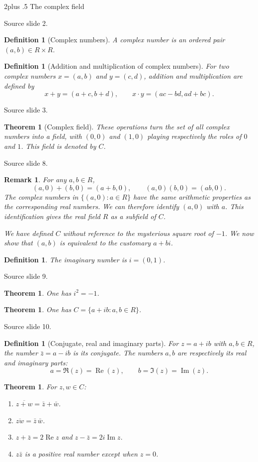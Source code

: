 \documentclass[10pt,letterpaper,twoside,openright]{amsbook}
\makeatletter
\numberwithin{equation}{subsection}
\renewcommand{\section}{\@startsection{section}{1}
 {\z@}{2\baselineskip plus .5\baselineskip}
 {\baselineskip}{\normalfont\Large\bfseries\centering}}
\theoremstyle{sea-plain}
\newtheorem{theorem}[subsection]{Theorem}
\theoremstyle{sea-definition}
\newtheorem{definition}[subsection]{Definition}
\newtheorem{remark}[subsection]{Remark}
\theoremstyle{sea-exercise}
\DeclareMathOperator{\Real}{Re}
\DeclareMathOperator{\Imag}{Im}
\newcommand{\RR}{\mathbb{R}}
\newcommand{\CC}{\mathbb{C}}
\newcommand{\DD}{\mathbb{D}}
\newcommand{\HH}{\mathbb{H}}
\newcommand{\Chat}{\mathbb{C}_{\infty}}
\def\CC{C}\def\RR{R}\def\DD{D}\def\HH{H}\def\Chat{C infinity}}
\newcommand{\src}[1]{\par\smallskip\noindent
 {\scriptsize\sffamily\color{SoftWhite}Source slide #1.}\par\nopagebreak\smallskip}
\makeatother
\begin{document}
\section{The complex field}
\src{2}
\begin{definition}[Complex numbers]
A complex number is an ordered pair $(a,b)\in\RR\times\RR$.
\end{definition}
\begin{definition}[Addition and multiplication of complex numbers]
For two complex numbers $x=(a,b)$ and $y=(c,d)$, addition and multiplication
are defined by
\[
 x+y=(a+c,b+d),\qquad x\cdot y=(ac-bd,ad+bc).
\]
\end{definition}
\src{3}
\begin{theorem}[Complex field]
These operations turn the set of all complex numbers into a field, with
$(0,0)$ and $(1,0)$ playing respectively the roles of $0$ and $1$.
This field is denoted by $\CC$.
\end{theorem}
\src{8}
\begin{remark}
For any $a,b\in\RR$,
\[
 (a,0)+(b,0)=(a+b,0),\qquad (a,0)(b,0)=(ab,0).
\]
The complex numbers in $\{(a,0):a\in\RR\}$ have the same arithmetic
properties as the corresponding real numbers. We can therefore identify
$(a,0)$ with $a$. This identification gives the real field $\RR$ as a
subfield of $\CC$.

We have defined $\CC$ without reference to the mysterious square root of
$-1$. We now show that $(a,b)$ is equivalent to the customary $a+bi$.
\end{remark}
\begin{definition}
The imaginary number is $i=(0,1)$.
\end{definition}
\src{9}
\begin{theorem}
One has $i^2=-1$.
\end{theorem}
\begin{theorem}
One has $\CC=\{a+ib:a,b\in\RR\}$.
\end{theorem}
\src{10}
\begin{definition}[Conjugate, real and imaginary parts]
For $z=a+ib$ with $a,b\in\RR$, the number $\bar z=a-ib$ is its conjugate.
The numbers $a,b$ are respectively its real and imaginary parts:
\[
 a=\Re(z)=\Real(z),\qquad b=\Im(z)=\Imag(z).
\]
\end{definition}
\begin{theorem}
For $z,w\in\CC$:
\begin{enumerate}[label=(\roman*)]
\item $\overline{z+w}=\bar z+\bar w$.
\item $\overline{zw}=\bar z\,\bar w$.
\item $z+\bar z=2\Real z$ and $z-\bar z=2i\Imag z$.
\item $z\bar z$ is a positive real number except when $z=0$.
\end{enumerate}
\end{theorem}
\end{document}
